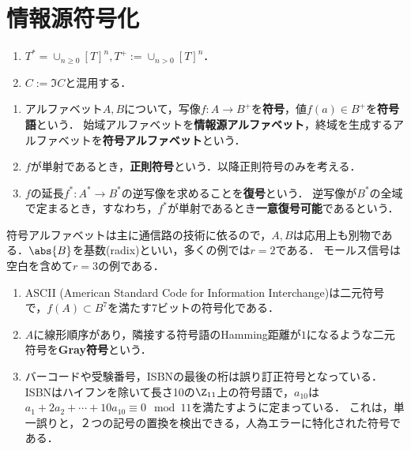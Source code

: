\documentclass[uplatex,dvipdfmx]{jsreport}
\begin{document}
\section{情報源符号化}

\begin{notation}\mbox{}
    \begin{enumerate}
        \item $T^*=\cup_{n\ge0}[T]^n,T^+:=\cup_{n>0}[T]^n$．
        \item $C:=\Im C$と混用する．
    \end{enumerate}
\end{notation}

\begin{definition}\mbox{}
    \begin{enumerate}
        \item アルファベット$A,B$について，写像$f:A\to B^+$を\textbf{符号}，値$f(a)\in B^+$を\textbf{符号語}という．
        始域アルファベットを\textbf{情報源アルファベット}，終域を生成するアルファベットを\textbf{符号アルファベット}という．
        \item $f$が単射であるとき，\textbf{正則符号}という．以降正則符号のみを考える．
        \item $f$の延長$f^*:A^*\to B^*$の逆写像を求めることを\textbf{復号}という．
        逆写像が$B^*$の全域で定まるとき，すなわち，$f^*$が単射であるとき\textbf{一意復号可能}であるという．
    \end{enumerate}
\end{definition}
\begin{remark}
    符号アルファベットは主に通信路の技術に依るので，$A,B$は応用上も別物である．$\abs{B}$を基数(radix)といい，多くの例では$r=2$である．
    モールス信号は空白を含めて$r=3$の例である．
\end{remark}
\begin{example}\mbox{}
    \begin{enumerate}
        \item ASCII (American Standard Code for Information Interchange)は二元符号で，$f(A)\subset B^7$を満たす7ビットの符号化である．
        \item $A$に線形順序があり，隣接する符号語のHamming距離が$1$になるような二元符号を\textbf{Gray符号}という．
        \item バーコードや受験番号，ISBNの最後の桁は誤り訂正符号となっている．
        ISBNはハイフンを除いて長さ10の$\Z_{11}$上の符号語で，$a_10$は$a_1+2a_2+\cdots+10a_{10}\equiv 0\mod 11$を満たすように定まっている．
        これは，単一誤りと，２つの記号の置換を検出できる，人為エラーに特化された符号である．
    \end{enumerate}
\end{example}
\end{document}
